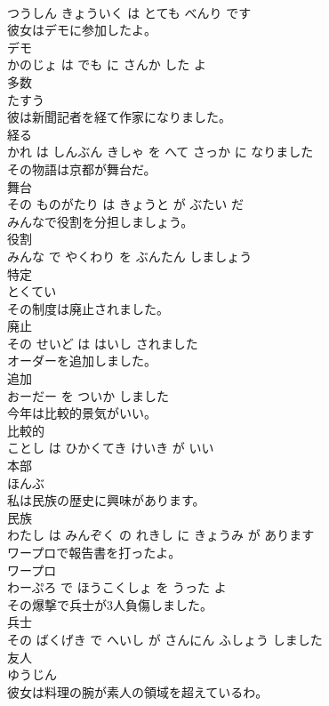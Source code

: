 \documentclass[8pt]{extreport}
\begin{document}
\begin{CJK}{UTF8}{min}
\\	つうしん きょういく は とても べんり です			
\\	彼女はデモに参加したよ。	
\\	デモ 
\\	かのじょ は でも に さんか した よ			
\\	多数	
\\	たすう		
\\	彼は新聞記者を経て作家になりました。	
\\	経る 
\\	かれ は しんぶん きしゃ を へて さっか に なりました			
\\	その物語は京都が舞台だ。	
\\	舞台 
\\	その ものがたり は きょうと が ぶたい だ			
\\	みんなで役割を分担しましょう。	
\\	役割 
\\	みんな で やくわり を ぶんたん しましょう			
\\	特定	
\\	とくてい		
\\	その制度は廃止されました。	
\\	廃止 
\\	その せいど は はいし されました			
\\	オーダーを追加しました。	
\\	追加 
\\	おーだー を ついか しました			
\\	今年は比較的景気がいい。	
\\	比較的 
\\	ことし は ひかくてき けいき が いい			
\\	本部	
\\	ほんぶ		
\\	私は民族の歴史に興味があります。	
\\	民族 
\\	わたし は みんぞく の れきし に きょうみ が あります			
\\	ワープロで報告書を打ったよ。	
\\	ワープロ 
\\	わーぷろ で ほうこくしょ を うった よ			
\\	その爆撃で兵士が3人負傷しました。	
\\	兵士 
\\	その ばくげき で へいし が さんにん ふしょう しました			
\\	友人	
\\	ゆうじん		
\\	彼女は料理の腕が素人の領域を超えているわ。	

\end{CJK}
\end{document}
